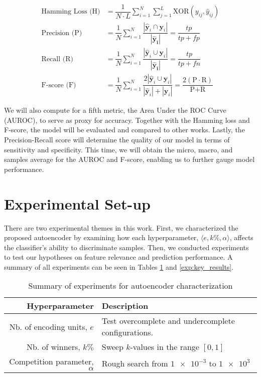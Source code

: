\begin{align}
    \text{Hamming Loss (H)} &= \dfrac{1}{N \cdot L} \sum_{i=1}^{N} \sum_{j=1}^{L}
    \text{XOR}(y_{ij}, \widehat{y}_{ij}) \\
    \text{Precision (P)} &=
    \dfrac{1}{N}\sum_{i=1}^{N}\dfrac{|\mathbf{\widehat{y}}_{i} \cap
    \mathbf{y}_{i}|}{|\mathbf{\widehat{y}_{i}}|} = \dfrac{tp}{tp + fp} \\
    \text{Recall (R)} &=
    \dfrac{1}{N}\sum_{i=1}^{N}\dfrac{|\mathbf{\widehat{y}}_{i} \cup
    \mathbf{y}_{i}|}{|\mathbf{\widehat{y}_{i}}|} = \dfrac{tp}{tp + fn} \\
    \text{F-score (F)} &=
    \dfrac{1}{N}\sum_{i=1}^{N} \dfrac{2 | \mathbf{\widehat{y}}_{i} \cup
        \mathbf{y}_{i}|}{|\mathbf{\widehat{y}}_{i} | + |\mathbf{y}_{i}|} =
        \dfrac{2 (\text{P} \cdot \text{R})}{\text{P} +
        \text{R}}
\end{align}

\par We will also compute for a fifth metric, the Area Under the ROC Curve
(AUROC), to serve as proxy for accuracy. Together with the Hamming loss and
F-score, the model will be evaluated and compared to other works. Lastly, the
Precision-Recall score will determine the quality of our model in terms of
sensitivity and specificity. This time, we will obtain the micro, macro, and
samples average for the AUROC and F-score, enabling us to further gauge model
performance.

\section{Experimental Set-up}
\label{MCExperiments}

There are two experimental themes in this work. First, we characterized the
proposed autoencoder by examining how each hyperparameter, $\langle e, k\%,
\alpha \rangle$, affects the classifier's ability to discriminate samples.
Then, we conducted experiments to test our hypotheses on feature relevance and
prediction performance. A summary of all experiments can be seen in Tables
\ref{exp:hyperparameter} and \ref{exp:key_results}.

\begin{table}[h]
  \centering
  \caption{Summary of experiments for autoencoder characterization}
  \label{exp:hyperparameter}
      \begin{tabular}{@{}rp{}@{}}
          \toprule
          Hyperparameter                      & Description \\ \midrule
          Nb. of encoding units, $e$    & Test overcomplete and undercomplete configurations.\\
          Nb. of winners, $k\%$     & Sweep $k$-values in the range $\left[ 0,1\right]$\\
          Competition parameter, $\alpha$ & Rough search from $\num{1e-3}$ to $\num{1e3}$\\ \bottomrule
      \end{tabular}
\end{table}

